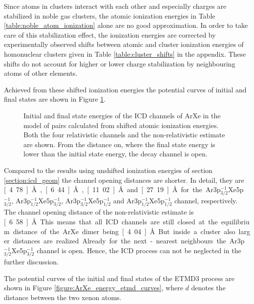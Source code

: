 Since atoms in clusters interact with each other and especially
charges are stabilized in noble gas clusters, the atomic
ionization energies  in Table \ref{table:noble_atom_ionization} alone
are no good approximation. In order to take care of
this stabilization effect, the ionization energies are corrected by experimentally
observed shifts between atomic and cluster ionization energies of homonuclear
clusters given in Table
\ref{table:cluster_shifts} in the appendix. These shifts do not account for
higher or
lower charge stabilization by neighbouring atoms of other elements.

Achieved from these shifted ionization energies the potential curves of
initial and final states are shown in Figure \ref{ArXe_energy_curves_shifted}.

\begin{figure}[htb]
 \centering
 
 \caption{Initial and final state energies of the ICD channels of ArXe in the
          model of pairs calculated from shifted atomic ionization energies.
          Both the four relativistic channels and
          the non-relativistic estimate are shown. From the distance on, where
          the final state energy is lower than the initial state energy, the
          decay channel is open.}
 \label{ArXe_energy_curves_shifted}
\end{figure}

Compared to the results using unshifted ionization energies of section
\ref{section:icd_geom} the
channel opening distances are shorter.
In detail, they are \unit[4.78]{\AA}, \unit[6.44]{\AA}, \unit[11.02]{\AA}
and \unit[27.19]{\AA} for the Ar3p$_{3/2}^{-1}$Xe5p$_{3/2}^{-1}$,
Ar3p$_{1/2}^{-1}$Xe5p$_{3/2}^{-1}$, Ar3p$_{3/2}^{-1}$Xe5p$_{1/2}^{-1}$ and
Ar3p$_{1/2}^{-1}$Xe5p$_{1/2}^{-1}$ channel, respectively. The channel
opening distance of the non-relativistic estimate is \unit[6.58]{\AA}.
This means that all \ac{ICD} channels are still closed at the equilibrium
distance of the ArXe dimer being \unit[4.04]{\AA}. But inside a
cluster also larger distances are
realized. Already for the next-nearest neighbours the
Ar3p$_{3/2}^{-1}$Xe5p$_{3/2}^{-1}$ channel is open. Hence, the \ac{ICD}
process can not be neglected in the further discussion.

The potential curves of the initial and final states of the \ac{ETMD}3
process are shown in Figure \ref{figure:ArXe_energy_etmd_curves}, where
$d$ denotes the distance between the two xenon atoms.

